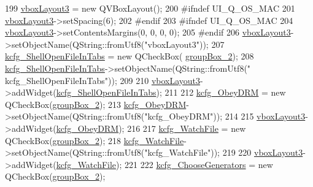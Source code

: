 \begin{DoxyCode}
199         \hyperlink{classUi__DlgGeneralBase_a457d320b774578a19aeb92dbe19f128e}{vboxLayout3} = \textcolor{keyword}{new} QVBoxLayout();
200 \textcolor{preprocessor}{#ifndef UI\_Q\_OS\_MAC}
201         \hyperlink{classUi__DlgGeneralBase_a457d320b774578a19aeb92dbe19f128e}{vboxLayout3}->setSpacing(6);
202 \textcolor{preprocessor}{#endif}
203 \textcolor{preprocessor}{#ifndef UI\_Q\_OS\_MAC}
204         \hyperlink{classUi__DlgGeneralBase_a457d320b774578a19aeb92dbe19f128e}{vboxLayout3}->setContentsMargins(0, 0, 0, 0);
205 \textcolor{preprocessor}{#endif}
206         \hyperlink{classUi__DlgGeneralBase_a457d320b774578a19aeb92dbe19f128e}{vboxLayout3}->setObjectName(QString::fromUtf8(\textcolor{stringliteral}{"vboxLayout3"}));
207         \hyperlink{classUi__DlgGeneralBase_abb932ae5a296f99d600ae0bd76423797}{kcfg\_ShellOpenFileInTabs} = \textcolor{keyword}{new} QCheckBox(
      \hyperlink{classUi__DlgGeneralBase_ae822e688fc0f616b4a29511bc5615a3d}{groupBox\_2});
208         \hyperlink{classUi__DlgGeneralBase_abb932ae5a296f99d600ae0bd76423797}{kcfg\_ShellOpenFileInTabs}->setObjectName(QString::fromUtf8(\textcolor{stringliteral}{"
      kcfg\_ShellOpenFileInTabs"}));
209 
210         \hyperlink{classUi__DlgGeneralBase_a457d320b774578a19aeb92dbe19f128e}{vboxLayout3}->addWidget(\hyperlink{classUi__DlgGeneralBase_abb932ae5a296f99d600ae0bd76423797}{kcfg\_ShellOpenFileInTabs});
211 
212         \hyperlink{classUi__DlgGeneralBase_ae06aa2913c5352f7291531fa8709216f}{kcfg\_ObeyDRM} = \textcolor{keyword}{new} QCheckBox(\hyperlink{classUi__DlgGeneralBase_ae822e688fc0f616b4a29511bc5615a3d}{groupBox\_2});
213         \hyperlink{classUi__DlgGeneralBase_ae06aa2913c5352f7291531fa8709216f}{kcfg\_ObeyDRM}->setObjectName(QString::fromUtf8(\textcolor{stringliteral}{"kcfg\_ObeyDRM"}));
214 
215         \hyperlink{classUi__DlgGeneralBase_a457d320b774578a19aeb92dbe19f128e}{vboxLayout3}->addWidget(\hyperlink{classUi__DlgGeneralBase_ae06aa2913c5352f7291531fa8709216f}{kcfg\_ObeyDRM});
216 
217         \hyperlink{classUi__DlgGeneralBase_ad78f563114498d2bcc4350d8939ad2ec}{kcfg\_WatchFile} = \textcolor{keyword}{new} QCheckBox(\hyperlink{classUi__DlgGeneralBase_ae822e688fc0f616b4a29511bc5615a3d}{groupBox\_2});
218         \hyperlink{classUi__DlgGeneralBase_ad78f563114498d2bcc4350d8939ad2ec}{kcfg\_WatchFile}->setObjectName(QString::fromUtf8(\textcolor{stringliteral}{"kcfg\_WatchFile"}));
219 
220         \hyperlink{classUi__DlgGeneralBase_a457d320b774578a19aeb92dbe19f128e}{vboxLayout3}->addWidget(\hyperlink{classUi__DlgGeneralBase_ad78f563114498d2bcc4350d8939ad2ec}{kcfg\_WatchFile});
221 
222         \hyperlink{classUi__DlgGeneralBase_ad63d50a9664ae9d855e43ac1a95e3629}{kcfg\_ChooseGenerators} = \textcolor{keyword}{new} QCheckBox(\hyperlink{classUi__DlgGeneralBase_ae822e688fc0f616b4a29511bc5615a3d}{groupBox\_2});

\end{DoxyCode}
